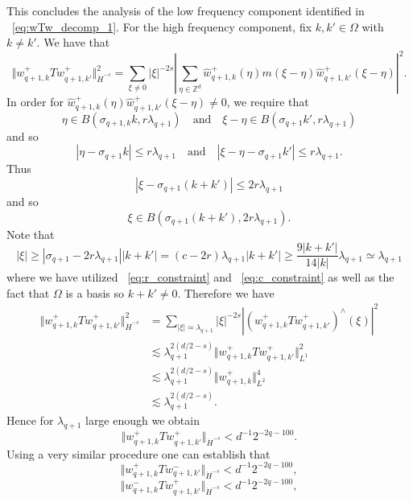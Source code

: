 \documentclass[12pt,reqno,letterpaper]{amsart}
\numberwithin{equation}{section}
\newcommand{\1}{{\bf 1}}
\newcommand{\2}{{\bf 2}}
\newcommand{\Z}{\mathbb Z}
\theoremstyle{remark}
\theoremstyle{remark}
\begin{document}
This concludes the analysis of the low frequency component identified in ~\eqref{eq:wTw_decomp_1}. For the high frequency component, fix $k,k' \in \Omega$ with $k \not= k'$. We have that
$$
\Vert w_{q+1,k}^+Tw_{q+1,k'}^+\Vert_{\dot{H}^{-s}}^2 = \sum_{\xi \not = 0} |\xi|^{-2s} \left|\sum_{\eta \in \Z^d} \hat{w}_{q+1,k}^+(\eta) m(\xi - \eta) \hat{w}_{q+1,k'}^+(\xi - \eta)\right|^2.
$$
In order for $\hat{w}_{q+1,k}^+(\eta) \hat{w}^+_{q+1,k'}(\xi - \eta) \not  = 0$, we require that
$$
\eta \in B(\sigma_{q+1,k}k, r\lambda_{q+1}) \quad \text{and} \quad \xi - \eta \in B(\sigma_{q+1}k',r\lambda_{q+1})
$$
and so
$$
|\eta - \sigma_{q+1}k| \leq r\lambda_{q+1} \quad \text{and} \quad |\xi - \eta - \sigma_{q+1}k'| \leq r\lambda_{q+1}.
$$
Thus
$$
|\xi - \sigma_{q+1}(k+k')| \leq 2r\lambda_{q+1}
$$
and so
$$
\xi \in B(\sigma_{q+1}(k+k'), 2r\lambda_{q+1}).
$$
Note that
$$
|\xi| \geq |\sigma_{q+1} - 2r\lambda_{q+1}||k+k'| = (c - 2r)\lambda_{q+1}|k+k'| \geq \frac{9|k+k'|}{14|k|} \lambda_{q+1} \simeq \lambda_{q+1}
$$
where we have utilized ~\eqref{eq:r_constraint} and ~\eqref{eq:c_constraint} as well as the fact that $\Omega$ is a basis so $k + k' \not= 0$. Therefore we have
\begin{equation*}
    \begin{split}
        \Vert w_{q+1,k}^+Tw_{q+1,k'}^+\Vert_{\dot{H}^{-s}}^2 &= \sum_{|\xi| \simeq \lambda_{q+1}} |\xi|^{-2s} \left|\left(w_{q+1,k}^+ Tw_{q+1,k'}^+\right)^{\wedge}(\xi)\right|^2\\
        &\lesssim \lambda_{q+1}^{2(d/2-s)} \Vert w_{q+1,k}^+ Tw_{q+1,k'}^+ \Vert_{L^1}^2\\
        &\lesssim \lambda_{q+1}^{2(d/2-s)} \Vert w_{q+1,k}^+ \Vert_{L^2}^4\\
        &\lesssim \lambda_{q+1}^{2(d/2-s)}.
    \end{split}
\end{equation*}
Hence for $\lambda_{q+1}$ large enough we obtain
\begin{equation}\label{eq:diff_dir_est1}
    \Vert w_{q+1,k}^+Tw_{q+1,k'}^+\Vert_{\dot{H}^{-s}} < d^{-1}2^{-2q-100}.
\end{equation}
Using a very similar procedure one can establish that
\begin{equation}\label{eq:diff_dir_est2}
    \Vert w_{q+1,k}^+Tw_{q+1,k'}^-\Vert_{\dot{H}^{-s}} < d^{-1}2^{-2q-100},
\end{equation}
\begin{equation}\label{eq:diff_dir_est3}
    \Vert w_{q+1,k}^-Tw_{q+1,k'}^+\Vert_{\dot{H}^{-s}} < d^{-1}2^{-2q-100},
\end{equation}
\end{document}

